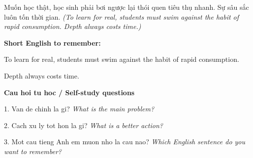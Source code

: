 \begin{baihoc}
Muốn học thật, học sinh phải bơi ngược lại thói quen tiêu thụ nhanh. Sự sâu sắc luôn tốn thời gian.
\textit{(To learn for real, students must swim against the habit of rapid consumption. Depth always costs time.)}
\end{baihoc}

\begin{ghinhoanh}
\textbf{Short English to remember:}

To learn for real, students must swim against the habit of rapid consumption.

Depth always costs time.

\end{ghinhoanh}

\begin{tuhocnhanh}
\textbf{Cau hoi tu hoc / Self-study questions}

1. Van de chinh la gi? \textit{What is the main problem?}

2. Cach xu ly tot hon la gi? \textit{What is a better action?}

3. Mot cau tieng Anh em muon nho la cau nao? \textit{Which English sentence do you want to remember?}
\end{tuhocnhanh}
